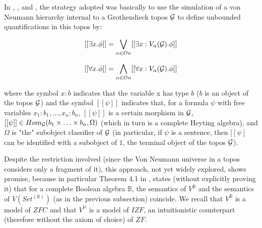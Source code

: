 \documentclass[10pt,longbibliography]{article}
\newcommand{\B}{\mathbb{B}}
\newcommand{\He}{\mathbb{H}}
\begin{document}

In \cite{Fourman80}, \cite{Hayashi81}, and \cite{Streicher09}, the strategy adopted was basically to use the simulation of a von Neumann hierarchy internal to a Grothendieck topos ${\cal G}$ to define unbounded quantifications in this topos by:

$$[[\exists x.\phi]] = \bigvee_{\alpha \in On} [[\exists x: V_\alpha({\cal G}).\phi]]$$

$$[[\forall x.\phi]] = \bigwedge_{\alpha \in On} [[\forall x: V_\alpha({\cal G}).\phi]]$$

where the symbol $x : b$ indicates that the variable x has type $b$ ($b$ is an object of the topos $\cal G$) and the symbol $[[\psi]]$ indicates that, for a formula $\psi$ with free variables $x_1:b_1, \ldots, x_n:b_n$, $[[\psi]]$ is a certain morphism in $\cal G$, $[[\psi]] \in Hom_{\cal G}(b_1 \times \ldots \times b_n,\Omega)$ (which in turn is a complete Heyting algebra), and $\Omega$ is "the" subobject classifier of $\cal G$ (in particular, if $\psi$ is a sentence, then $[[\psi]$ can be identified with a subobject of $1$, the terminal object of the topos $\cal G$).




Despite the restriction involved (since the Von Neumann universe in a topos considers only a fragment of it), this approach, not yet widely explored, shows promise, because in particular Theorem 4.1 in \cite{Fourman80}, states (without explicitly proving it) that for a complete Boolean algebra $\B$, the semantics of $V^\B$ and the semantics of $V(Set^{(\B)})$ (as in the previous subsection) coincide. We recall that $V^\B$ is a model of $ZFC$ and that $V^\He$ is a model of $IZF$, an intuitionistic counterpart (therefore without the axiom of choice) of $ZF$.
\end{document}
